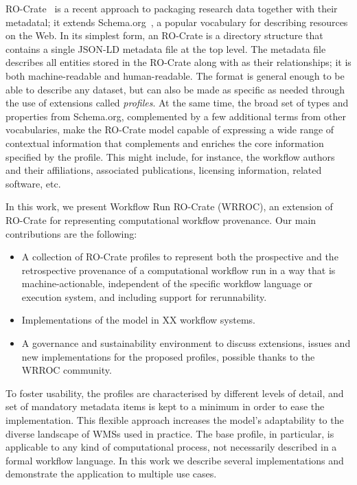 \documentclass[10pt,letterpaper]{article}
\begin{document}
RO-Crate~\cite{Soiland-Reyes 2022a} is a recent approach to packaging research data together with their metadatal; it extends Schema.org~\cite{Guha 2015}, a popular vocabulary for describing resources on the Web.
In its simplest form, an RO-Crate is a directory structure that contains a single JSON-LD metadata file at the top level.
The metadata file describes all entities stored in the RO-Crate along with as their relationships; it is both machine-readable and human-readable.
The format is general enough to be able to describe any dataset, but can also be made as specific as needed through the use of extensions called
\emph{profiles}.
At the same time, the broad set of types and properties from Schema.org, complemented by a few additional terms from other vocabularies, make the RO-Crate model capable of expressing a wide range of contextual information that complements and enriches the core information specified by the profile.
This might include, for instance, the workflow authors and their affiliations, associated publications, licensing information, related software, etc.

In this work, we present Workflow Run RO-Crate (WRROC), an extension of RO-Crate for representing computational workflow provenance.
Our main contributions are the following:

\begin{itemize}
\item   A collection of RO-Crate profiles to represent both the prospective and the retrospective provenance of a computational   workflow run in a way that is machine-actionable,  independent of the specific  workflow language or   execution system, and including support for rerunnability.
\item   Implementations of the model in XX workflow systems.
\item   A governance and sustainability environment to discuss extensions,  issues and new implementations for the proposed   profiles, possible thanks to the WRROC community.
\end{itemize}

To foster usability, the profiles are characterised by different levels of detail, and set of mandatory metadata items is kept to a minimum in order to ease the implementation.
This flexible approach increases the model's adaptability to the diverse landscape of WMSs used in practice.
The base profile, in particular, is applicable to any kind of computational process, not necessarily described in a formal workflow language.
In this work we describe several implementations and demonstrate the application to multiple use cases.
\end{document}
